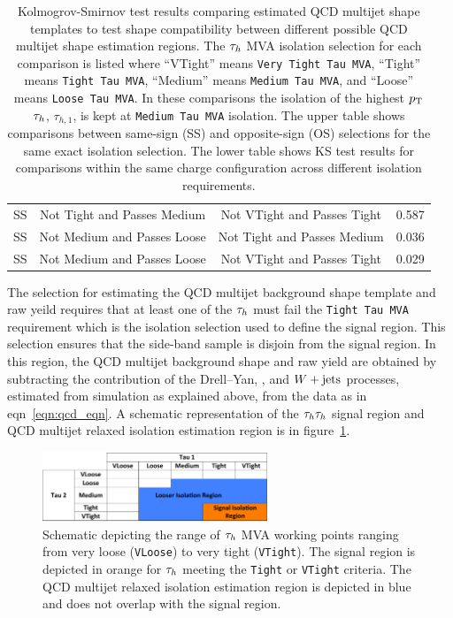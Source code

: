 \begin{table}[h!]
\begin{center}
{\begin{tabular}{|c|c|c|c|}
SS & Not Tight and Passes Medium & Not VTight and Passes Tight & 0.587 \\
SS & Not Medium and Passes Loose & Not Tight and Passes Medium & 0.036 \\
SS & Not Medium and Passes Loose & Not VTight and Passes Tight & 0.029 \\
\hline
\end{tabular}
}
\end{center}
\caption{
Kolmogrov-Smirnov test results comparing estimated QCD multijet shape templates to test shape compatibility
between different possible QCD multijet shape estimation regions. The $\tau_{h}$ MVA isolation selection
for each comparison is listed where ``VTight'' means \texttt{Very Tight Tau MVA}, ``Tight'' means \texttt{Tight Tau MVA},
``Medium'' means \texttt{Medium Tau MVA}, and ``Loose'' means \texttt{Loose Tau MVA}.
In these comparisons the isolation of the highest $p_\mathrm{T}$ $\tau_{h}$, $\tau_{h,1}$,
is kept at \texttt{Medium Tau MVA} isolation.  
The upper table shows comparisons between same-sign (SS) and opposite-sign (OS) selections for the same
exact isolation selection. The lower table shows KS test results for comparisons
within the same charge configuration across different isolation requirements.
}
\label{tab:htt_qcd_ks}
\end{table} 

The selection for estimating the QCD multijet background shape template and raw yeild requires 
that at least one of the $\tau_{h}$
must fail the \texttt{Tight Tau MVA} requirement which is the isolation selection used to 
define the signal region. This selection
ensures that the side-band sample is disjoin from the signal region.
In this region, the QCD multijet background shape and raw yield are obtained
by subtracting the contribution of the Drell--Yan, \ttbar, and $W+\text{jets}$ processes, 
estimated from simulation as explained above, from the data as in eqn~\ref{eqn:qcd_eqn}.
A schematic representation of the $\tau_{h}\tau_{h}$ signal region and QCD multijet relaxed
isolation estimation region is in figure~\ref{fig:htt_tautau_qcd_schematic1}.


\begin{figure}[htbp]
\centering
     \includegraphics[width=0.6\textwidth]{higgs_to_taus/plots/tautau_QCD_signal_region.pdf}
     \caption{
Schematic depicting the range of $\tau_{h}$ MVA working points ranging from very loose (\texttt{VLoose})
to very tight (\texttt{VTight}). The signal region is depicted in orange for $\tau_{h}$ meeting the \texttt{Tight}
or \texttt{VTight} criteria. The QCD multijet relaxed isolation estimation region is depicted in blue and
does not overlap with the signal region.
     }
     \label{fig:htt_tautau_qcd_schematic1}
\end{figure}

